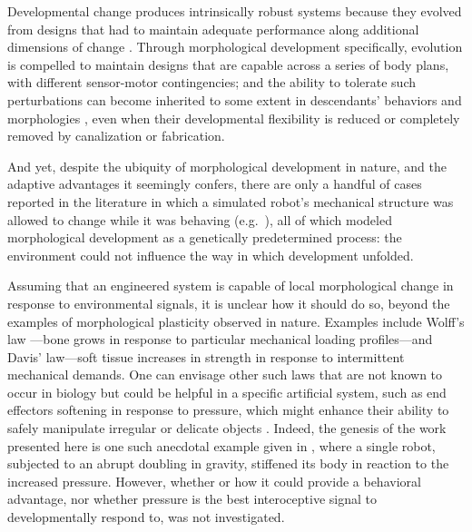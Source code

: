 Developmental change produces intrinsically robust systems because they evolved from designs that had to maintain adequate performance along additional dimensions of change \citep{bongard2011morphological,kriegman2017morphological}.
Through morphological development specifically, evolution is compelled to maintain designs that are capable across a series of body plans, with different 
sensor-motor contingencies; and the ability to tolerate such perturbations can become inherited to some extent in descendants' behaviors \cite{bongard2011morphological} and morphologies \cite{kriegman2017morphological}, even when their developmental flexibility is reduced or completely removed by canalization or fabrication.


And yet, despite the ubiquity of
morphological development in nature, and the adaptive advantages it seemingly confers, there are only a handful of cases reported in the literature in which a simulated robot's mechanical structure was allowed to change while it was behaving 
(e.g.~\citep{ventrella1998designing,
komosinski2003framsticks,
bongard2011morphological,
kriegman2017morphological,
kriegman2017minimal}),
all of which modeled morphological development as a genetically predetermined process: the environment could not influence the way in which development unfolded. 


Assuming that an engineered system is capable of local morphological change in response to environmental signals, it is unclear how it should do so, beyond the examples of morphological plasticity observed in nature. 
Examples include Wolff's law \citep{ruff2006s}---bone grows in response to particular mechanical loading profiles---and Davis' law---soft tissue increases in strength in response to intermittent mechanical demands.
One can envisage other such laws that are not known to occur in biology but could be helpful in a specific artificial system, such as end effectors softening in response to pressure, which might enhance their ability to safely manipulate irregular or delicate objects \cite{brown2010universal}.
Indeed, the genesis of the work presented here is one such anecdotal example given in \citep{corucci2017evolutionary}, where a single robot, subjected to an abrupt doubling in gravity, stiffened its body in reaction to the increased pressure.
However, whether or how it could provide a behavioral advantage, nor whether pressure is the best interoceptive signal to developmentally respond to,
was not investigated.


